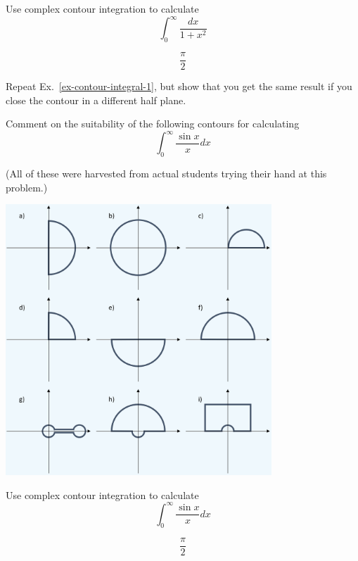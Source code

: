 \begin{exer}
  \label{ex-contour-integral-1}
Use complex contour integration to calculate
$$\int_0^{\infty} \frac{dx}{1+x^2}$$
\begin{sol}
$$\frac{\pi}{2}$$
\end{sol}
\end{exer}

\begin{exer}
Repeat Ex.~\ref{ex-contour-integral-1}, but show that you get the same result if you close the contour in a different half plane.
\end{exer}

\begin{exer}
  Comment on the suitability of the following contours for calculating
  $$ \int_0^{\infty} \frac{\sin x}{x} dx$$

  (All of these were harvested from actual students trying their hand at this problem.)

\begin{center}
\includegraphics[width=10cm]{complex/figures/contours}
\end{center}
  
\end{exer}

\begin{exer}
Use complex contour integration to calculate
$$ \int_0^{\infty} \frac{\sin x}{x} dx$$
\begin{sol}
$$\frac{\pi}{2}$$
\end{sol}
\end{exer}

